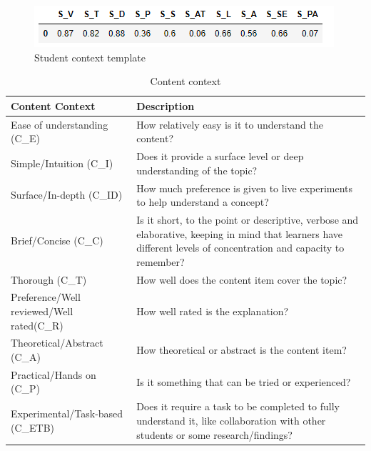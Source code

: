 \begin{figure}[H]
    \centering
    \includegraphics[scale=1.0]{Figures/student_context.PNG}
    \caption{Student context template}
    \label{chap5:sc_template}
\end{figure}


\begin{table}[H]
    \centering
 \begin{tabular}{|p{3.8cm}|p{10.3cm}|} 
    \hline
    \textrm{\textbf{Content Context}} & \textrm{\textbf{Description}} \\ \hline
    \textrm{Ease of understanding (C\_E)} & \textrm{How relatively easy is it to understand the content?}\\ \hline
    \textrm{Simple/Intuition (C\_I)} & \textrm{Does it provide a surface level or deep understanding of the topic?} \\ \hline
    \textrm{Surface/In-depth (C\_ID)} & \textrm{How much preference is given to live experiments to help understand a concept?} \\ \hline
    \textrm{Brief/Concise (C\_C)} & \textrm{Is it short, to the point or descriptive, verbose and elaborative, keeping in mind that learners have different levels of concentration and capacity to remember?} \\ \hline
    \textrm{Thorough (C\_T)} & \textrm{How well does the content item cover the topic?} \\ \hline
    \textrm{Preference/Well reviewed/Well rated(C\_R)} & \textrm{How well rated is the explanation? } \\ \hline
    \textrm{Theoretical/Abstract (C\_A)} & \textrm{How theoretical or abstract is the content item?} \\ \hline
    \textrm{Practical/Hands on (C\_P)} & \textrm{Is it something that can be tried or experienced?} \\ \hline
    \textrm{Experimental/Task-based (C\_ETB)} & \textrm{Does it require a task to be completed to fully understand it, like collaboration with other students or some research/findings?} \\ \hline
    \end{tabular}
    \caption{Content context}
    \label{chap5:content}
\end{table}

